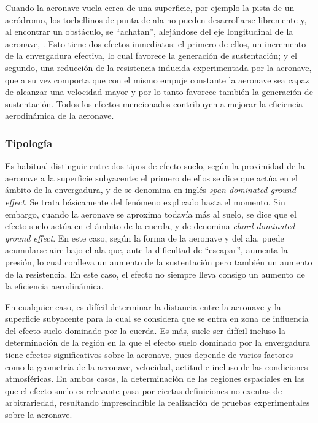 Cuando la aeronave vuela cerca de una superficie, por ejemplo la pista de un aeródromo, los torbellinos de punta de ala no pueden desarrollarse libremente y, al encontrar un obstáculo, se “achatan”, alejándose del eje longitudinal de la aeronave, 
. Esto tiene dos efectos inmediatos: el primero de ellos, un incremento de la envergadura efectiva, lo cual favorece la generación de sustentación; y el segundo, una reducción de la resistencia inducida experimentada por la aeronave, que a su vez comporta que con el mismo empuje constante la aeronave sea capaz de alcanzar una velocidad mayor y por lo tanto favorece también la generación de sustentación. Todos los efectos mencionados contribuyen a mejorar la eficiencia aerodinámica de la aeronave.


\subsubsection{Tipología}
\label{sec:wig:ge:tipology}

Es habitual distinguir entre dos tipos de efecto suelo, según la proximidad de la aeronave a la superficie subyacente: el primero de ellos se dice que actúa en el ámbito de la envergadura, y de se denomina en inglés \emph{span-dominated ground effect}. Se trata básicamente del fenómeno explicado hasta el momento. Sin embargo, cuando la aeronave se aproxima todavía más al suelo, se dice que el efecto suelo actúa en el ámbito de la cuerda, y de denomina \emph{chord-dominated ground effect}. En este caso, según la forma de la aeronave y del ala, puede acumularse aire bajo el ala que, ante la dificultad de “escapar”, aumenta la presión, lo cual conlleva un aumento de la sustentación pero también un aumento de la resistencia. En este caso, el efecto no siempre lleva consigo un aumento de la eficiencia aerodinámica.

En cualquier caso, es difícil determinar la distancia entre la aeronave y la superficie subyacente para la cual se considera que se entra en zona de influencia del efecto suelo dominado por la cuerda. Es más, suele ser difícil incluso la determinación de la región en la que el efecto suelo dominado por la envergadura tiene efectos significativos sobre la aeronave, pues depende de varios factores como la geometría de la aeronave, velocidad, actitud e incluso de las condiciones atmosféricas. En ambos casos, la determinación de las regiones espaciales en las que el efecto suelo es relevante pasa por ciertas definiciones no exentas de arbitrariedad, resultando imprescindible la realización de pruebas experimentales sobre la aeronave.


